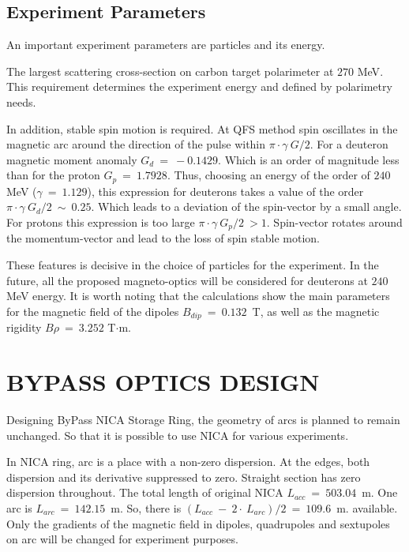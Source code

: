 \documentclass[a4paper,
               keeplastbox,   %
               ]{jacow}
\begin{document}
\subsection{Experiment Parameters}

\par An important experiment parameters are particles and its energy.
\par The largest scattering cross-section on carbon target polarimeter at $270$ MeV\cite{FS}.
This requirement determines the experiment energy and defined by polarimetry needs.
\par In addition, stable spin motion is required.
At QFS method spin oscillates in the magnetic arc around the direction of the pulse within $\pi\cdot\gamma~G/2$. 
For a deuteron magnetic moment anomaly $G_d~=~-0.1429$. Which is an order of magnitude less than for the proton $G_p~=~1.7928$.
Thus, choosing an energy of the order of $240$ MeV ($\gamma~=~1.129$), 
this expression for deuterons takes a value of the order $\pi\cdot\gamma~G_d/2~\sim~0.25$. 
Which leads to a deviation of the spin-vector by a small angle.
For protons this expression is too large $\pi\cdot\gamma~G_p/2~>1$. Spin-vector rotates around the momentum-vector and lead to the loss of spin stable motion.

\par These features is decisive in the choice of particles for the experiment. In the future, all the proposed magneto-optics will be considered for deuterons at $240$ MeV energy. It is worth noting that the calculations show the main parameters for the magnetic field of the dipoles $B_{dip}~=~0.132$~T, as well as the magnetic rigidity $B\rho~=~3.252$ T$\cdot$m.

\section{BYPASS OPTICS DESIGN}

\par Designing ByPass NICA Storage Ring, 
the geometry of arcs is planned to remain unchanged. 
So that it is possible to use NICA for various experiments. 
\par In NICA ring, arc is a place with a non-zero dispersion. At the edges, 
both dispersion and its derivative suppressed to zero. Straight section has zero dispersion throughout. 
The total length of original NICA $L_{acc}~=~503.04$~m. One arc is $L_{arc}~=~142.15$~m. 
So, there is $(L_{acc}~-~2\cdot~L_{arc})/2~=~109.6$~m. available.
Only the gradients of the magnetic field in dipoles, quadrupoles and sextupoles on arc will be changed for experiment purposes.
\end{document}
